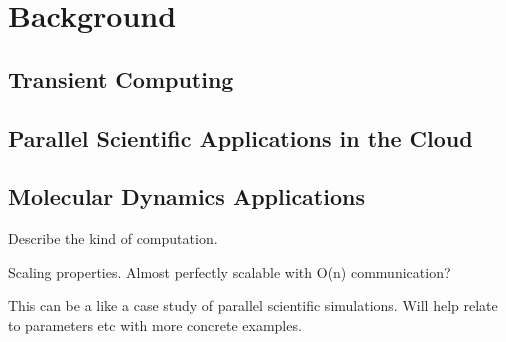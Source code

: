
\section{Background}

\subsection{Transient Computing}

\subsection{Parallel Scientific Applications in the Cloud}

\subsection{Molecular Dynamics Applications}
Describe the kind of computation.

Scaling properties. Almost perfectly scalable with O(n) communication? 

This can be a like a case study of parallel scientific simulations.
Will help relate to parameters etc with more concrete examples.






